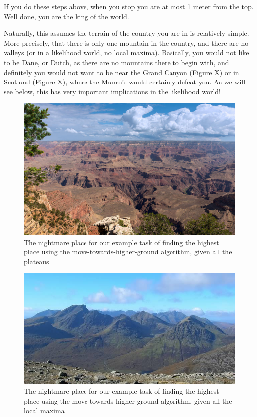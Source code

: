 \documentclass[
]{book}
\begin{document}
If you do these steps above, when you stop you are at most 1 meter from the top. Well done, you are the king of the world.

Naturally, this assumes the terrain of the country you are in is relatively simple. More precisely, that there is only one mountain in the country, and there are no valleys (or in a likelihood world, no local maxima). Basically, you would not like to be Dane, or Dutch, as there are no mountains there to begin with, and definitely you would not want to be near the Grand Canyon (Figure X) or in Scotland (Figure X), where the Munro's would certainly defeat you. As we will see below, this has very important implications in the likelihood world!

\begin{figure}
\centering
\includegraphics{extfiles/grand-canyon.jpg}
\caption{The nightmare place for our example task of finding the highest place using the move-towards-higher-ground algorithm, given all the plateaus}
\end{figure}

\begin{figure}
\centering
\includegraphics{extfiles/munros.jpg}
\caption{The nightmare place for our example task of finding the highest place using the move-towards-higher-ground algorithm, given all the local maxima}
\end{figure}
\end{document}
